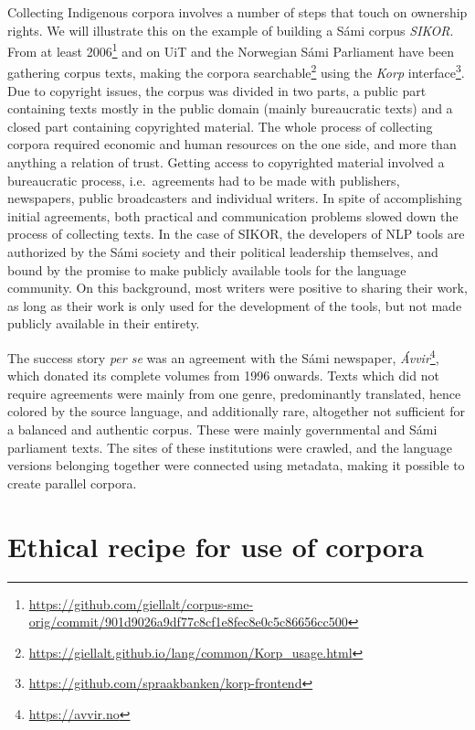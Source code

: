 \documentclass[free]{flammie}
\begin{document}
Collecting Indigenous corpora involves a number of steps that touch on ownership
rights. We will illustrate this on the example of building a Sámi corpus
\textit{SIKOR}.  From at least
2006\footnote{\url{https://github.com/giellalt/corpus-sme-orig/commit/901d9026a9df77c8cf1e8fec8e0c5c86656cc500}}
and on UiT and the Norwegian Sámi Parliament have been gathering corpus texts,
making the corpora
searchable\footnote{\url{https://giellalt.github.io/lang/common/Korp_usage.html}}
using the \textit{Korp}
interface\footnote{\url{https://github.com/spraakbanken/korp-frontend}}.  Due to
copyright issues, the corpus was divided in two parts, a public part containing
texts mostly in the public domain (mainly bureaucratic texts) and a closed part
containing copyrighted material.  The whole process of collecting corpora
required economic and human resources on the one side, and more than anything a
relation of trust.  Getting access to copyrighted material involved a
bureaucratic process, i.e.\ agreements had to be made with publishers,
newspapers, public broadcasters and individual writers. In spite of
accomplishing initial agreements, both practical and communication problems
slowed down the process of collecting texts.  In the case of SIKOR, the
developers of NLP tools are authorized by the Sámi society and their political
leadership themselves, and bound by the promise to make publicly available tools
for the language community.  On this background, most writers were positive to
sharing their work, as long as their work is only used for the development of
the tools, but not made publicly available in their entirety.

The success story \textit{per se} was an agreement with the Sámi newspaper,
\textit{Ávvir}\footnote{\url{https://avvir.no}}, which donated its complete
volumes from 1996 onwards.  Texts which did not require agreements were mainly
from one genre, predominantly translated, hence colored by the source language,
and additionally rare, altogether not sufficient for a balanced and authentic
corpus.  These were mainly governmental and Sámi parliament texts. The sites of
these institutions were crawled, and the language versions belonging together
were connected using metadata, making it possible to create parallel corpora.





\section{Ethical recipe for use of corpora}
\end{document}
